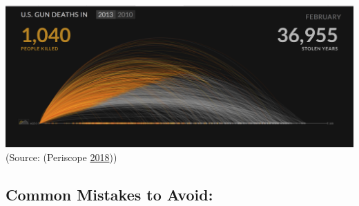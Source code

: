 \documentclass[]{book}
\begin{document}
\includegraphics{images/Tufte_figure12.png} (Source: (Periscope
\protect\hyperlink{ref-narratives_2017}{2018}))

\subsection{Common Mistakes to Avoid:}\label{common-mistakes-to-avoid}
\end{document}
